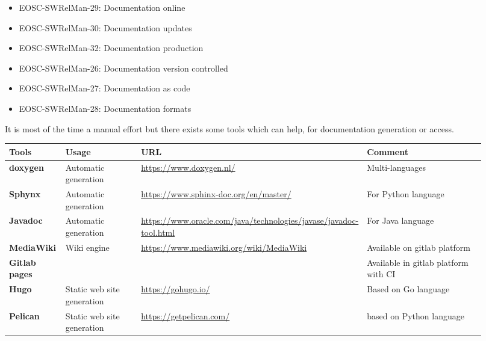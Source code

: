 \begin{itemize}
  \item EOSC-SWRelMan-29: Documentation online
  \item EOSC-SWRelMan-30: Documentation updates
  \item EOSC-SWRelMan-32: Documentation production
  \item EOSC-SWRelMan-26: Documentation version controlled
  \item EOSC-SWRelMan-27: Documentation as code
  \item EOSC-SWRelMan-28: Documentation formats
\end{itemize}

It is most of the time a manual effort but there exists some tools
which can help, for documentation generation or access.

\begin{center}
  \label{tab:tools_pack}
  \small
  \begin{tabular}{|p{0.12\linewidth}|p{0.2\linewidth}|p{0.25\linewidth}|p{0.35\linewidth}|} \hline

    \textbf{Tools} & \textbf{Usage} & \textbf{URL} & \textbf{Comment} \\ \hline \hline
    \textbf{doxygen} & Automatic generation & \url{https://www.doxygen.nl/}
    & Multi-languages \\ \hline
    \textbf{Sphynx} & Automatic generation & \url{https://www.sphinx-doc.org/en/master/}
    & For Python language \\ \hline
    \textbf{Javadoc} & Automatic generation & \url{https://www.oracle.com/java/technologies/javase/javadoc-tool.html}
    & For Java language  \\ \hline
    \textbf{MediaWiki} & Wiki engine & \url{https://www.mediawiki.org/wiki/MediaWiki}
    &  Available on gitlab platform \\ \hline
    \textbf{Gitlab pages} &  & \url{}
    & Available in gitlab platform with CI  \\ \hline
    \textbf{Hugo} & Static web site generation & \url{https://gohugo.io/}
    &   Based on Go language \\ \hline
    \textbf{Pelican} & Static web site generation & \url{https://getpelican.com/}
    &  based on Python language \\ \hline

  \end{tabular}
\end{center}

